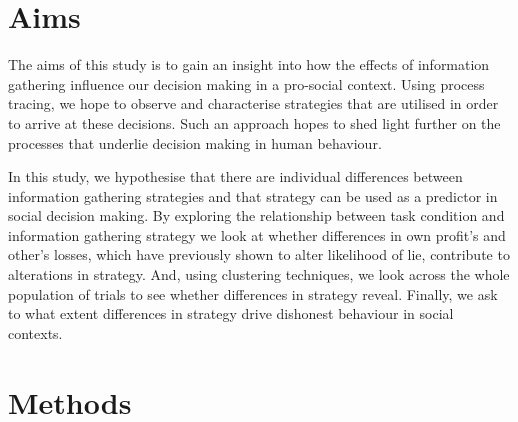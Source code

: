 \documentclass[man, floatsintext]{apa7}
\begin{document}
\section{Aims}

The aims of this study is to gain an insight into how the effects of information gathering influence our decision making in a pro-social context.  Using process tracing, we hope to observe and characterise strategies that are utilised in order to arrive at these decisions. Such an approach hopes to shed light further on the processes that underlie decision making in human behaviour.

In this study, we hypothesise that there are individual differences between information gathering strategies and that strategy can be used as a predictor in social decision making. By exploring the relationship between task condition and information gathering strategy we look at whether differences in own profit's and other's losses, which have previously shown to alter likelihood of lie, contribute to alterations in strategy. And, using clustering techniques, we look across the whole population of trials to see whether differences in strategy reveal. Finally, we ask to what extent differences in strategy drive dishonest behaviour in social contexts.

\section{Methods}


%
%
%
\end{document}
